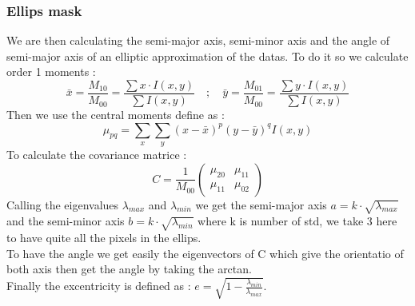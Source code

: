 \documentclass{article}
\begin{document}
\subsubsection{Ellips mask}
We are then calculating the semi-major axis, semi-minor axis and the angle of semi-major axis of an elliptic approximation of the datas.
To do it so we calculate order 1 moments :
$$
\bar{x} = \frac{M_{10}}{M_{00}} = \frac{\sum x \cdot I(x,y)}{\sum I(x,y)} \quad ; \quad \bar{y} = \frac{M_{01}}{M_{00}} = \frac{\sum y \cdot I(x,y)}{\sum I(x,y)}
$$
Then we use the central moments define as :
$$
\mu_{pq} = \sum_{x} \sum_{y} (x - \bar{x})^p (y - \bar{y})^q I(x, y)
$$
To calculate the covariance matrice :
$$
C = \frac{1}{M_{00}} \begin{pmatrix} \mu_{20} & \mu_{11} \\ \mu_{11} & \mu_{02} \end{pmatrix}
$$
Calling the eigenvalues $\lambda_{max}$ and $\lambda_{min}$ we get the semi-major axis $a = k \cdot \sqrt{\lambda_{max}}$
and the semi-minor axis $b = k \cdot \sqrt{\lambda_{min}}$ where k is number of std, we take 3 here to have quite all the pixels in the ellips.\\
To have the angle we get easily the eigenvectors of C which give the orientatio of both axis then get the angle by taking the arctan.\\
Finally the excentricity is defined as : $e = \sqrt{1 - \frac{\lambda_{min}}{\lambda_{max}}}$.
\end{document}
